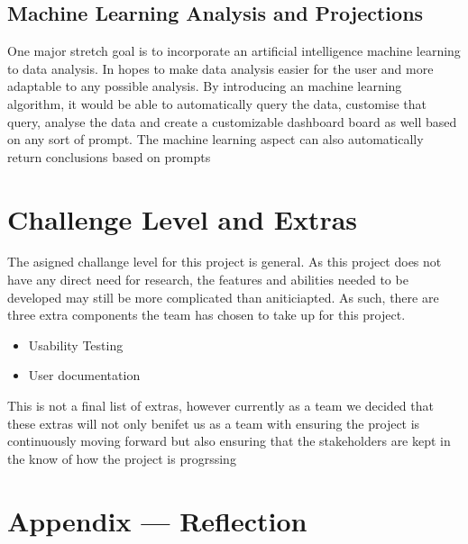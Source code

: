 \documentclass{article}
\begin{document}
\subsection*{Machine Learning Analysis and Projections}
One major stretch goal is to incorporate an artificial intelligence machine
learning to data analysis. In hopes to make data analysis easier for the user
and more adaptable to any possible analysis. By introducing an machine learning
algorithm, it would be able to automatically query the data, customise that
query, analyse the data and create a customizable dashboard board as well based
on any sort of prompt. The machine learning aspect can also automatically return
conclusions based on prompts

\section{Challenge Level and Extras}

The asigned challange level for this project is general. As this project does not have any direct need for research, 
the features and abilities needed to be developed may still be more complicated than aniticiapted. 
As such, there are three extra components the team has chosen to take up for this project. 
\begin{itemize}
    \item Usability Testing
    \item User documentation
\end{itemize}
This is not a final list of extras, however currently as a team we decided that
these extras will not only benifet us as a team with ensuring the project is
continuously moving forward but also ensuring that the stakeholders are kept in
the know of how the project is progrssing

\newpage{}

\section*{Appendix --- Reflection}


\end{document}
